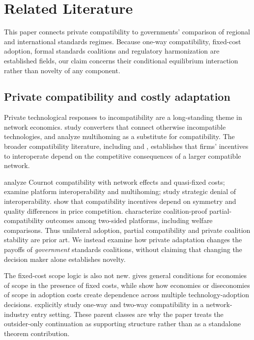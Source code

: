 \section{Related Literature}
\label{sec:literature}

This paper connects private compatibility to governments' comparison of regional and international standards regimes. Because one-way compatibility, fixed-cost adoption, formal standards coalitions and regulatory harmonization are established fields, our claim concerns their conditional equilibrium interaction rather than novelty of any component.

\subsection{Private compatibility and costly adaptation}
\label{subsec:lit-private-compatibility}

Private technological responses to incompatibility are a long-standing theme in network economics. \citet{farrellSaloner1992} study converters that connect otherwise incompatible technologies, and \citet{doganogluWright2006} analyze multihoming as a substitute for compatibility. The broader compatibility literature, including \citet{katzShapiro1985} and \citet{besenFarrell1994}, establishes that firms' incentives to interoperate depend on the competitive consequences of a larger compatible network.

\citet{buccellaEtAl2023} analyze Cournot compatibility with network effects and quasi-fixed costs; \citet{bourreauEtAl2026} examine platform interoperability and multihoming; \citet{mottaPeitz2025} study strategic denial of interoperability. \citet{innocentiMenicucci2021} show that compatibility incentives depend on symmetry and quality differences in price competition. \citet{dingKoShen2022} characterize coalition-proof partial-compatibility outcomes among two-sided platforms, including welfare comparisons. Thus unilateral adoption, partial compatibility and private coalition stability are prior art. We instead examine how private adaptation changes the payoffs of \emph{government} standards coalitions, without claiming that changing the decision maker alone establishes novelty.

The fixed-cost scope logic is also not new. \citet{gorman1985} gives general conditions for economies of scope in the presence of fixed costs, while \citet{choMcCardle2009} show how economies or diseconomies of scope in adoption costs create dependence across multiple technology-adoption decisions. \citet{manentiSomma2008} explicitly study one-way and two-way compatibility in a network-industry entry setting. These parent classes are why the paper treats the outsider-only continuation as supporting structure rather than as a standalone theorem contribution.

